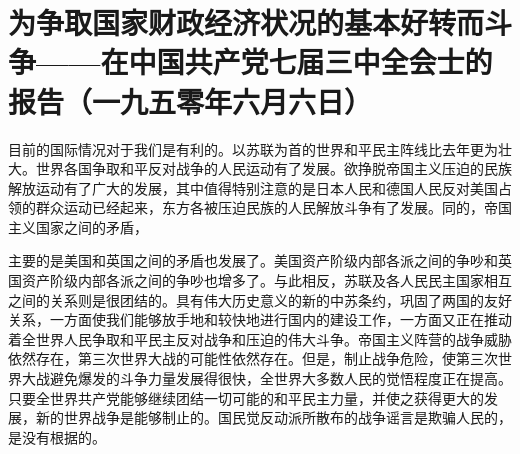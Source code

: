 \section[为争取国家财政经济状况的基本好转而斗争——在中国共产党七届三中全会士的报告（一九五零年六月六日）]{为争取国家财政经济状况的基本好转而斗争——在中国共产党七届三中全会士的报告（一九五零年六月六日）}


目前的国际情况对于我们是有利的。以苏联为首的世界和平民主阵线比去年更为壮大。世界各国争取和平反对战争的人民运动有了发展。欲挣脱帝国主义压迫的民族解放运动有了广大的发展，其中值得特别注意的是日本人民和德国人民反对美国占领的群众运动已经起来，东方各被压迫民族的人民解放斗争有了发展。同的，帝国主义国家之间的矛盾，

主要的是美国和英国之间的矛盾也发展了。美国资产阶级内部各派之间的争吵和英国资产阶级内部各派之间的争吵也增多了。与此相反，苏联及各人民民主国家相互之间的关系则是很团结的。具有伟大历史意义的新的中苏条约，巩固了两国的友好关系，一方面使我们能够放手地和较快地进行国内的建设工作，一方面又正在推动着全世界人民争取和平民主反对战争和压迫的伟大斗争。帝国主义阵营的战争威胁依然存在，第三次世界大战的可能性依然存在。但是，制止战争危险，使第三次世界大战避免爆发的斗争力量发展得很快，全世界大多数人民的觉悟程度正在提高。只要全世界共产党能够继续团结一切可能的和平民主力量，并使之获得更大的发展，新的世界战争是能够制止的。国民觉反动派所散布的战争谣言是欺骗人民的，是没有根据的。

